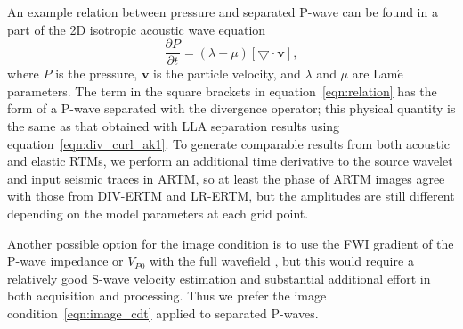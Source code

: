\documentclass[manuscript,ulem,graphix,revised]{geophysics}
\begin{document}
An example relation between pressure and separated P-wave can be found in a part of the 2D isotropic acoustic wave equation
\begin{equation}
\frac{\partial P}{\partial t}=(\lambda+\mu) [\bigtriangledown \cdot  \boldsymbol{v}],
\label{eqn:relation}
\end{equation}
where $P$ is the pressure, $\boldsymbol{v}$ is the particle velocity, and $\lambda$ and $\mu$ are Lam$\acute{\mathrm{e}}$ parameters. The term in the square brackets in equation~\ref{eqn:relation} has the form of a P-wave separated with the divergence operator; this physical quantity is the same as that obtained with LLA separation results using equation~\ref{eqn:div_curl_ak1}. 
To generate comparable results from both acoustic and elastic RTMs, we perform an additional time derivative to the source wavelet and input seismic traces in ARTM, so at least the phase of ARTM images agree with those from DIV-ERTM and LR-ERTM, but the amplitudes are still different depending on the model parameters at each grid point.

Another possible option for the image condition is to use the FWI gradient of the P-wave impedance or $V_{P0}$ with the full wavefield \citep{operto13,wang17}, but this would require a relatively good S-wave velocity estimation and substantial additional effort in both acquisition and processing. Thus we prefer the image condition~\ref{eqn:image_cdt} applied to separated P-waves.
\end{document}
